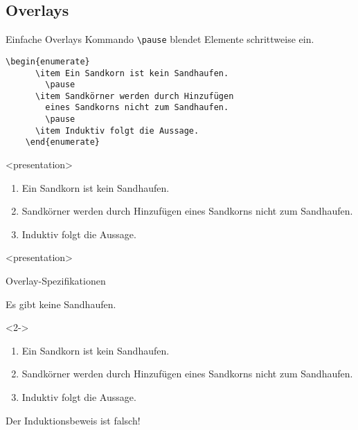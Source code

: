 
\subsection{Overlays}

\begin{Frame}[fragile]{Einfache Overlays}
  Kommando \lstinline-\pause- blendet Elemente schrittweise ein.

  \begin{lstlisting}[gobble=4]
    \begin{enumerate}
      \item Ein Sandkorn ist kein Sandhaufen.
        \pause
      \item Sandkörner werden durch Hinzufügen
        eines Sandkorns nicht zum Sandhaufen.
        \pause
      \item Induktiv folgt die Aussage.
    \end{enumerate}
  \end{lstlisting}

  \xxx

  \begin{onlyenv}<presentation>
    \begin{enumerate}
      \item Ein Sandkorn ist kein Sandhaufen.
        \pause
      \item Sandkörner werden durch Hinzufügen
        eines Sandkorns nicht zum Sandhaufen.
        \pause
      \item Induktiv folgt die Aussage.
    \end{enumerate}
  \end{onlyenv}
\end{Frame}

\mode
<presentation>

\begin{Frame}{Overlay-Spezifikationen}
  \begin{Satz}[Sandhaufensatz]
    Es gibt keine Sandhaufen.
  \end{Satz}

  \begin{Beweis}<2->
    \begin{enumerate}
      \item<3-> Ein Sandkorn ist kein Sandhaufen.
      \item<4-> Sandkörner werden durch Hinzufügen
        eines Sandkorns nicht zum Sandhaufen.
      \item Induktiv folgt die Aussage. \qedhere
    \end{enumerate}
  \end{Beweis}


  Der \alert<6>{Induktionsbeweis} ist
  \alert<7>{falsch}!
\end{Frame}

